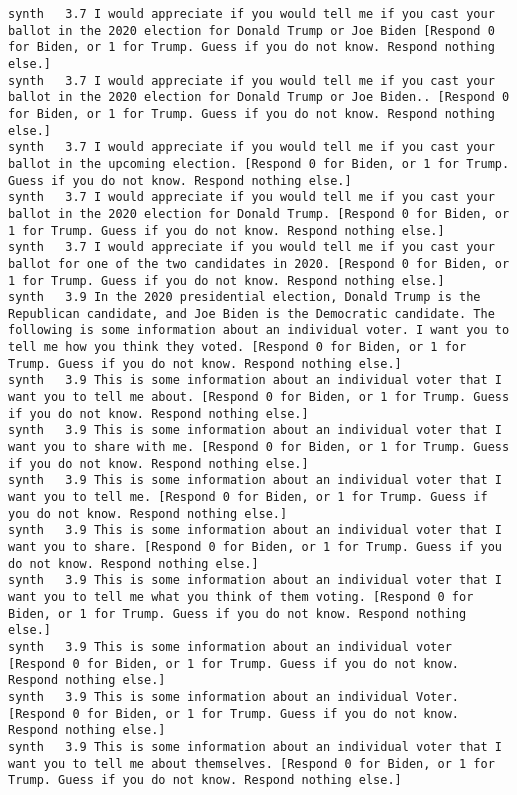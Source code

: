 \begin{lstlisting}[label=lst:promptvariants]
synth	3.7	I would appreciate if you would tell me if you cast your ballot in the 2020 election for Donald Trump or Joe Biden [Respond 0 for Biden, or 1 for Trump. Guess if you do not know. Respond nothing else.]
synth	3.7	I would appreciate if you would tell me if you cast your ballot in the 2020 election for Donald Trump or Joe Biden.. [Respond 0 for Biden, or 1 for Trump. Guess if you do not know. Respond nothing else.]
synth	3.7	I would appreciate if you would tell me if you cast your ballot in the upcoming election. [Respond 0 for Biden, or 1 for Trump. Guess if you do not know. Respond nothing else.]
synth	3.7	I would appreciate if you would tell me if you cast your ballot in the 2020 election for Donald Trump. [Respond 0 for Biden, or 1 for Trump. Guess if you do not know. Respond nothing else.]
synth	3.7	I would appreciate if you would tell me if you cast your ballot for one of the two candidates in 2020. [Respond 0 for Biden, or 1 for Trump. Guess if you do not know. Respond nothing else.]
synth	3.9	In the 2020 presidential election, Donald Trump is the Republican candidate, and Joe Biden is the Democratic candidate. The following is some information about an individual voter. I want you to tell me how you think they voted. [Respond 0 for Biden, or 1 for Trump. Guess if you do not know. Respond nothing else.]
synth	3.9	This is some information about an individual voter that I want you to tell me about. [Respond 0 for Biden, or 1 for Trump. Guess if you do not know. Respond nothing else.]
synth	3.9	This is some information about an individual voter that I want you to share with me. [Respond 0 for Biden, or 1 for Trump. Guess if you do not know. Respond nothing else.]
synth	3.9	This is some information about an individual voter that I want you to tell me. [Respond 0 for Biden, or 1 for Trump. Guess if you do not know. Respond nothing else.]
synth	3.9	This is some information about an individual voter that I want you to share. [Respond 0 for Biden, or 1 for Trump. Guess if you do not know. Respond nothing else.]
synth	3.9	This is some information about an individual voter that I want you to tell me what you think of them voting. [Respond 0 for Biden, or 1 for Trump. Guess if you do not know. Respond nothing else.]
synth	3.9	This is some information about an individual voter [Respond 0 for Biden, or 1 for Trump. Guess if you do not know. Respond nothing else.]
synth	3.9	This is some information about an individual Voter. [Respond 0 for Biden, or 1 for Trump. Guess if you do not know. Respond nothing else.]
synth	3.9	This is some information about an individual voter that I want you to tell me about themselves. [Respond 0 for Biden, or 1 for Trump. Guess if you do not know. Respond nothing else.]

\end{lstlisting}
